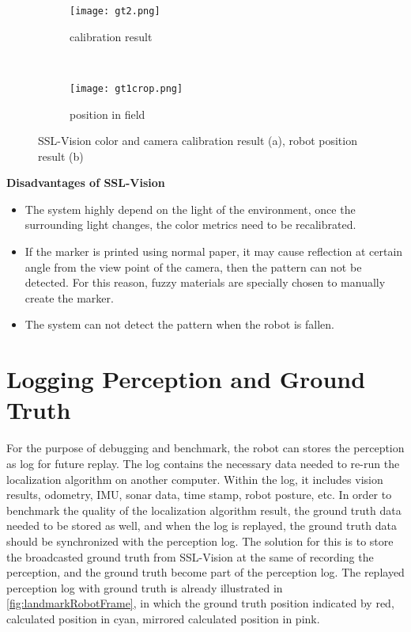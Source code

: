 \begin{figure}[h!]
        \centering
        \begin{subfigure}[h]{0.59\textwidth}
                \texttt{[image: gt2.png]}
                \caption{calibration result}
                \label{fig:calibration}
        \end{subfigure}%
        ~ %
        \begin{subfigure}[h]{0.41\textwidth}
                \texttt{[image: gt1crop.png]}
                \caption{position in field}
                \label{fig:position}
        \end{subfigure}%
	\caption{SSL-Vision color and camera calibration result (a), robot position result (b)}
	\label{fig:sslVision result}
\end{figure}


\noindent\textbf{Disadvantages of SSL-Vision}
\begin{itemize}
  \item The system highly depend on the light of the environment, once the surrounding light changes, the color metrics need to be recalibrated. 
  \item If the marker is printed using normal paper, it may cause reflection at certain angle from the view point of the camera, then the pattern can not be detected. For this reason, fuzzy materials are specially chosen to manually create the marker. 
  \item The system can not detect the pattern when the robot is fallen.
\end{itemize}

\section{Logging Perception and Ground Truth}
\label{sub:Logging Perception and Ground Truth}
For the purpose of debugging and benchmark, the robot can stores the perception as log for future replay. The log contains the necessary data needed to re-run the localization algorithm on another computer. Within the log, it includes vision results, odometry, \gls{IMU}, sonar data, time stamp, robot posture, etc. In order to benchmark the quality of the localization algorithm result, the ground truth data needed to be stored as well, and when the log is replayed, the ground truth data should be synchronized with the perception log. The solution for this is to store the broadcasted ground truth from SSL-Vision at the same of recording the perception, and the ground truth become part of the perception log. The replayed perception log with ground truth is already illustrated in \autoref{fig:landmarkRobotFrame}, in which the ground truth position indicated by red, calculated position in cyan, mirrored calculated position in pink.

